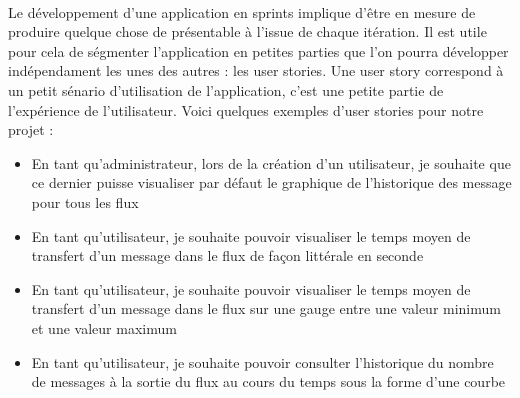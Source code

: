 			\paragraph{}%
			Le développement d'une application en sprints implique d'être en mesure de
			produire quelque chose de présentable à l'issue de chaque itération.
			Il est utile pour cela de ségmenter l'application en petites parties que
			l'on pourra développer indépendament les unes des autres : les user stories.
			Une user story correspond à un petit sénario d'utilisation de
			l'application, c'est une petite partie de l'expérience de l'utilisateur.
			Voici quelques exemples d'user stories pour notre projet :
			\begin{itemize}
			  \item En tant qu'administrateur, lors de la création d'un utilisateur, je
			  souhaite que ce dernier puisse visualiser par défaut le graphique de
			  l'historique des message pour tous les flux
			  \item En tant qu'utilisateur, je souhaite pouvoir visualiser le temps moyen
			  de transfert d'un message dans le flux de façon littérale en seconde
			  \item En tant qu'utilisateur, je souhaite pouvoir visualiser le temps
			  moyen de transfert d'un message dans le flux sur une gauge entre une
			  valeur minimum et une valeur maximum
			  \item En tant qu'utilisateur, je souhaite pouvoir consulter l'historique du
			  nombre de messages à la sortie du flux au cours du temps sous la forme
			  d'une courbe
			\end{itemize}
			
